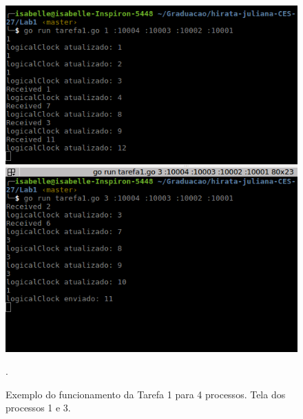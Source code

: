 \documentclass[conference]{IEEEtran}
\begin{document}
\begin{figure}[H]
\centering
\centerline{\includegraphics[scale=0.4]{imagens/tarefa1-testecriado-1.png}}
\caption{Exemplo do funcionamento da Tarefa 1 para 4 processos. Tela dos processos 1 e 3.}.
\label{tarefa1-testecriado-1}
\end{figure}
\end{document}
